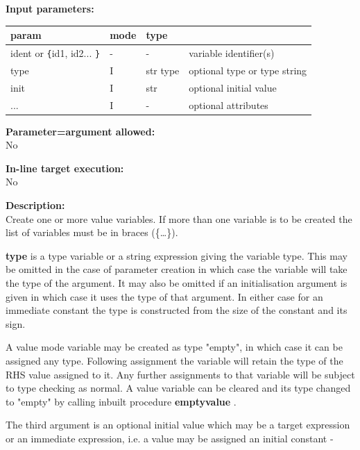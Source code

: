         {\bf Input parameters:} \\
        \begin{tabular}{| l | l | l | l |}
        \hline
        param  & mode & type & \\
        \hline \hline
        ident or \verb'{'id1, id2... \verb'}' & - &  -       & variable identifier(s)       \\ \hline
        type                   & I & str type & optional type or type string \\ \hline
        init                   & I & str      & optional initial value       \\ \hline
        ...                    & I &  -       & optional attributes          \\ \hline
        \end{tabular}
        
        {\bf Parameter=argument allowed:} \\
        No
        
        {\bf In-line target execution:} \\
        No
        
        {\bf Description:} \\
        Create one or more value variables. If more than one variable is to be
        created the list of variables must be in braces (\{\dots\}).
        
        {\bf type}
        is a type variable or a string expression giving the variable type.
        This may be omitted in the case of parameter creation in which case
        the variable will take the type of the argument. It may also be
        omitted if an initialisation argument is given in which case it uses
        the type of that argument. In either case for an immediate constant
        the type is constructed from the size of the constant and its sign.

        A value mode variable may be created as type "empty", in which case it
        can be assigned any type. Following assignment the variable will
        retain the type of the RHS value assigned to it. Any further
        assignments to that variable will be subject to type checking as
        normal. A value variable can be cleared and its type changed to
        "empty" by calling inbuilt procedure {\bf emptyvalue}
        .

        The third argument is an optional initial value which may be a target
        expression or an immediate expression, i.e. a value may be assigned an
        initial constant -
        
